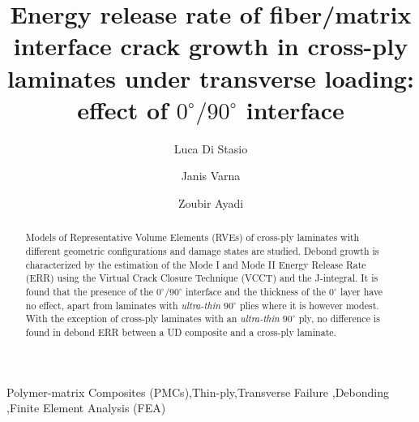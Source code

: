 \documentclass[review]{elsarticle}
\begin{document}
\begin{frontmatter}

\title{Energy release rate of fiber/matrix interface crack growth in cross-ply laminates under transverse loading: effect of $0^{\circ}/90^{\circ}$ interface}


\author[lulea,nancy]{Luca Di Stasio}
\author[lulea]{Janis Varna}
\author[nancy]{Zoubir Ayadi}


\address[lulea]{Lule\aa\ University of Technology, University Campus, SE-97187 Lule\aa, Sweden}
\address[nancy]{Universit\'e de Lorraine, EEIGM, IJL, 6 Rue Bastien Lepage, F-54010 Nancy, France}

\begin{abstract}
\noindent
Models of Representative Volume Elements (RVEs) of cross-ply laminates with different geometric configurations and damage states are studied. Debond growth is characterized by the estimation of the Mode I and Mode II Energy Release Rate (ERR) using the Virtual Crack Closure Technique (VCCT) and the J-integral. It is found that the presence of the $0^{\circ}/90^{\circ}$ interface and the thickness of the $0^{\circ}$ layer have no effect, apart from laminates with \emph{ultra-thin} $90^{\circ}$ plies where it is however modest. With the exception of cross-ply laminates with an \emph{ultra-thin} $90^{\circ}$ ply, no difference is found in debond ERR between a UD composite and a cross-ply laminate.
\end{abstract}

\begin{keyword}
Polymer-matrix Composites (PMCs)\sep Thin-ply\sep Transverse Failure \sep Debonding \sep Finite Element Analysis (FEA)
\end{keyword}


\end{frontmatter}
\end{document}

